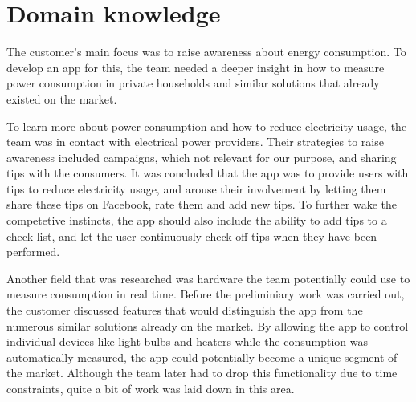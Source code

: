 \section{Domain knowledge}
The customer's main focus was to raise awareness about energy consumption. To develop an app for this, the team needed a deeper insight in how to measure power consumption in private households and similar solutions that already existed on the market.

To learn more about power consumption and how to reduce electricity usage, the team was in contact with electrical power providers. Their strategies to raise awareness included campaigns, which not relevant for our purpose, and sharing tips with the consumers. It was concluded that the app was to provide users with tips to reduce electricity usage, and arouse their involvement by letting them share these tips on Facebook, rate them and add new tips. To further wake the competetive instincts, the app should also include the ability to add tips to a check list, and let the user continuously check off tips when they have been performed.

Another field that was researched was hardware the team potentially could use to measure consumption in real time. Before the preliminiary work was carried out, the customer discussed features that would distinguish the app from the numerous similar solutions already on the market. By allowing the app to control individual devices like light bulbs and heaters while the consumption was automatically measured, the app could potentially become a unique segment of the market. Although the team later had to drop this functionality due to time constraints, quite a bit of work was laid down in this area. 



